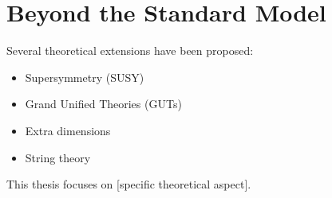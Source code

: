\section{Beyond the Standard Model}
\label{sec:THEORY_BEYOND_THE_STANDARD_MODEL}

Several theoretical extensions have been proposed:
\begin{itemize}
  \item Supersymmetry (SUSY)
  \item Grand Unified Theories (GUTs)
  \item Extra dimensions
  \item String theory
\end{itemize}

This thesis focuses on [specific theoretical aspect].

